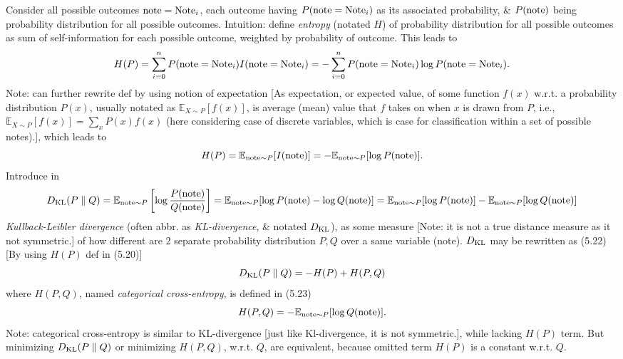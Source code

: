 \documentclass{article}
\begin{document}
\begin{itemize}
\begin{itemize}
\begin{itemize}
			Consider all possible outcomes ${\rm note} = {\rm Note}_i$, each outcome having $P({\rm note} = {\rm Note}_i)$ as its associated probability, \& $P({\rm note})$ being probability distribution for all possible outcomes. Intuition: define {\it entropy} (notated $H$) of probability distribution for all possible outcomes as sum of self-information for each possible outcome, weighted by probability of outcome. This leads to
			\begin{equation*}
				H(P) = \sum_{i=0}^n P({\rm note} = {\rm Note}_i)I({\rm note} = {\rm Note}_i) = -\sum_{i=0}^n P({\rm note} = {\rm Note}_i)\log P({\rm note} = {\rm Note}_i).
			\end{equation*}
			Note: can further rewrite def by using notion of expectation [As expectation, or expected value, of some function $f(x)$ w.r.t. a probability distribution $P(x)$, usually notated as $\mathbb{E}_{X\sim P}[f(x)]$, is average (mean) value that $f$ takes on when $x$ is drawn from $P$, i.e., $\mathbb{E}_{X\sim P}[f(x)] = \sum_x P(x)f(x)$ (here considering case of discrete variables, which is case for classification within a set of possible notes).], which leads to
			\begin{equation*}
				H(P) = \mathbb{E}_{{\rm note}\sim P}[I({\rm note})] = -\mathbb{E}_{{\rm note}\sim P}[\log P({\rm note})].
			\end{equation*}
			Introduce in
			\begin{equation*}
				D_{\rm KL}(P\parallel Q) = \mathbb{E}_{{\rm note}\sim P}\left[\log\frac{P({\rm note})}{Q({\rm note})}\right] = \mathbb{E}_{{\rm note}\sim P}[\log P({\rm note}) - \log Q({\rm note})] = \mathbb{E}_{{\rm note}\sim P}[\log P({\rm note})] - \mathbb{E}_{{\rm note}\sim P}[\log Q({\rm note})]
			\end{equation*}
			{\it Kullback-Leibler divergence} (often abbr. as {\it KL-divergence}, \& notated $D_{\rm KL}$), as some measure [Note: it is not a true distance measure as it not symmetric.] of how different are 2 separate probability distribution $P,Q$ over a same variable (note). $D_{\rm KL}$ may be rewritten as (5.22) [By using $H(P)$ def in (5.20)]
			\begin{equation*}
				D_{\rm KL}(P\parallel Q) = -H(P) + H(P,Q)
			\end{equation*}
			where $H(P,Q)$, named {\it categorical cross-entropy}, is defined in (5.23)
			\begin{equation*}
				H(P,Q) = -\mathbb{E}_{{\rm note}\sim P}[\log Q({\rm note})].
			\end{equation*}
			Note: categorical cross-entropy is similar to KL-divergence [just like Kl-divergence, it is not symmetric.], while lacking $H(P)$ term. But minimizing $D_{\rm KL}(P\parallel Q)$ or minimizing $H(P,Q)$, w.r.t. $Q$, are equivalent, because omitted term $H(P)$ is a constant w.r.t. $Q$.
			

\end{itemize}
\end{itemize}
\end{itemize}
\end{document}
